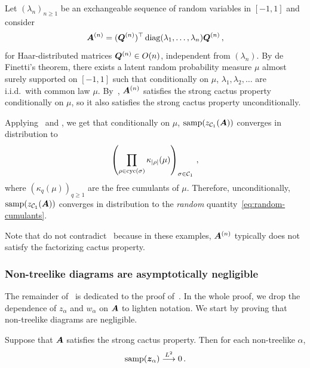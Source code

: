 \begin{example}\label{ex:finetti}
    Let $(\lambda_n)_{n\ge 1}$
    be an exchangeable sequence of random variables in $[-1,1]$ and consider
    \[{\bm A}^{(n)} = ({\bm Q}^{(n)})^\top \operatorname{diag}(\lambda_1, \ldots, \lambda_n) {\bm Q}^{(n)}\,,\]
    for Haar-distributed matrices ${\bm Q}^{(n)} \in O(n)$, independent from $(\lambda_n)$. By de Finetti's
    theorem, there exists a latent random
    probability measure $\mu$ almost
    surely supported on $[-1,1]$ such that
    conditionally on $\mu$, $\lambda_1,\lambda_2,\ldots$ are i.i.d.\ with common law $\mu$.
    By~, ${\bm A}^{(n)}$ satisfies the strong
    cactus property conditionally on
    $\mu$, so it also satisfies the strong
    cactus property unconditionally.

    Applying~ and ,
    we get that conditionally on $\mu$,
    $\mathrm{samp}(z_{{\cal C}_1}({\bm A}))$ converges in
    distribution to
    \begin{align}
        \left(\prod_{\rho\in\mathrm{cyc}(\sigma)} \kappa_{|\rho|}(\mu)\right)_{\sigma\in {\cal C}_1}\,,\label{eq:random-cumulants}
    \end{align}
    where $(\kappa_q(\mu))_{q\ge 1}$
    are the free cumulants of $\mu$.
    Therefore, {unconditionally}, 
    $\mathrm{samp}(z_{{\cal C}_1}({\bm A}))$ converges
    in distribution to the {\em random}
    quantity~\cref{eq:random-cumulants}.
\end{example}

\noindent Note that  do not contradict~ because in these
examples,
${\bm A}^{(n)}$
typically does not 
satisfy the factorizing
cactus property.

\subsubsection{Non-treelike diagrams are asymptotically negligible}
\label{sec:treelike}

The remainder of~ is dedicated to
the proof of~. In the whole proof, we drop the dependence
of $z_\alpha$ and $w_\alpha$ on ${\bm A}$ 
to lighten notation.
We start by proving that
non-treelike diagrams are negligible.

\begin{lemma}
    \label{lem:non-treelike}
    Suppose that ${\bm A}$ satisfies the
    strong cactus property. Then for each non-treelike $\alpha$,
    \[
        \mathrm{samp}({\bm z}_\alpha)\overset{L^2}{\longrightarrow} 0\,.
    \]
\end{lemma}

